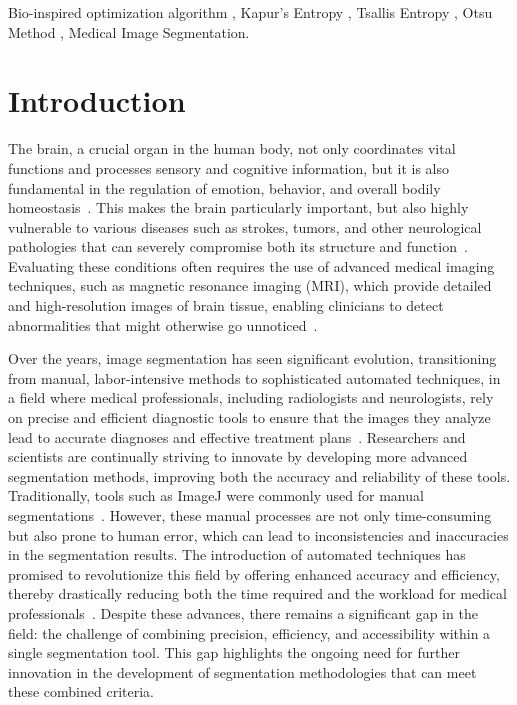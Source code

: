 \documentclass{elsarticle}
\begin{document}
\begin{frontmatter}
\begin{abstract}
\end{abstract}

\begin{keyword}
Bio-inspired optimization algorithm \sep
Kapur's Entropy \sep
Tsallis Entropy \sep 
Otsu Method \sep 
Medical Image Segmentation.
\end{keyword}

\end{frontmatter}

\section{Introduction}

The brain, a crucial organ in the human body, not only coordinates vital functions and processes sensory and cognitive information, but it is also fundamental in the regulation of emotion, behavior, and overall bodily homeostasis~\cite{Raichle2010}. This makes the brain particularly important, but also highly vulnerable to various diseases such as strokes, tumors, and other neurological pathologies that can severely compromise both its structure and function~\cite{Fornito2015,Kreisl2008}. Evaluating these conditions often requires the use of advanced medical imaging techniques, such as magnetic resonance imaging (MRI), which provide detailed and high-resolution images of brain tissue, enabling clinicians to detect abnormalities that might otherwise go unnoticed~\cite{Young2007,Mehrabian2019}.

Over the years, image segmentation has seen significant evolution, transitioning from manual, labor-intensive methods to sophisticated automated techniques, in a field where medical professionals, including radiologists and neurologists, rely on precise and efficient diagnostic tools to ensure that the images they analyze lead to accurate diagnoses and effective treatment plans~\cite{Halder2019}. Researchers and scientists are continually striving to innovate by developing more advanced segmentation methods, improving both the accuracy and reliability of these tools. Traditionally, tools such as ImageJ were commonly used for manual segmentations~\cite{Liu2024}. However, these manual processes are not only time-consuming but also prone to human error, which can lead to inconsistencies and inaccuracies in the segmentation results. The introduction of automated techniques has promised to revolutionize this field by offering enhanced accuracy and efficiency, thereby drastically reducing both the time required and the workload for medical professionals~\cite{Ilesanmi2024}. Despite these advances, there remains a significant gap in the field: the challenge of combining precision, efficiency, and accessibility within a single segmentation tool. This gap highlights the ongoing need for further innovation in the development of segmentation methodologies that can meet these combined criteria.
\end{document}
